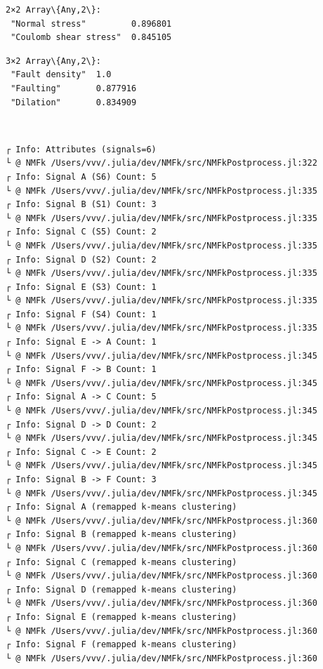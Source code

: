 \documentclass[11pt]{article}
\begin{document}
    \begin{Verbatim}[commandchars=\\\{\}]
2×2 Array\{Any,2\}:
 "Normal stress"         0.896801
 "Coulomb shear stress"  0.845105
    \end{Verbatim}



    \begin{Verbatim}[commandchars=\\\{\}]
3×2 Array\{Any,2\}:
 "Fault density"  1.0
 "Faulting"       0.877916
 "Dilation"       0.834909
    \end{Verbatim}


    \begin{center}
    \end{center}
    { \hspace*{\fill} \\}

    \begin{Verbatim}[commandchars=\\\{\}]
┌ Info: Attributes (signals=6)
└ @ NMFk /Users/vvv/.julia/dev/NMFk/src/NMFkPostprocess.jl:322
┌ Info: Signal A (S6) Count: 5
└ @ NMFk /Users/vvv/.julia/dev/NMFk/src/NMFkPostprocess.jl:335
┌ Info: Signal B (S1) Count: 3
└ @ NMFk /Users/vvv/.julia/dev/NMFk/src/NMFkPostprocess.jl:335
┌ Info: Signal C (S5) Count: 2
└ @ NMFk /Users/vvv/.julia/dev/NMFk/src/NMFkPostprocess.jl:335
┌ Info: Signal D (S2) Count: 2
└ @ NMFk /Users/vvv/.julia/dev/NMFk/src/NMFkPostprocess.jl:335
┌ Info: Signal E (S3) Count: 1
└ @ NMFk /Users/vvv/.julia/dev/NMFk/src/NMFkPostprocess.jl:335
┌ Info: Signal F (S4) Count: 1
└ @ NMFk /Users/vvv/.julia/dev/NMFk/src/NMFkPostprocess.jl:335
┌ Info: Signal E -> A Count: 1
└ @ NMFk /Users/vvv/.julia/dev/NMFk/src/NMFkPostprocess.jl:345
┌ Info: Signal F -> B Count: 1
└ @ NMFk /Users/vvv/.julia/dev/NMFk/src/NMFkPostprocess.jl:345
┌ Info: Signal A -> C Count: 5
└ @ NMFk /Users/vvv/.julia/dev/NMFk/src/NMFkPostprocess.jl:345
┌ Info: Signal D -> D Count: 2
└ @ NMFk /Users/vvv/.julia/dev/NMFk/src/NMFkPostprocess.jl:345
┌ Info: Signal C -> E Count: 2
└ @ NMFk /Users/vvv/.julia/dev/NMFk/src/NMFkPostprocess.jl:345
┌ Info: Signal B -> F Count: 3
└ @ NMFk /Users/vvv/.julia/dev/NMFk/src/NMFkPostprocess.jl:345
┌ Info: Signal A (remapped k-means clustering)
└ @ NMFk /Users/vvv/.julia/dev/NMFk/src/NMFkPostprocess.jl:360
┌ Info: Signal B (remapped k-means clustering)
└ @ NMFk /Users/vvv/.julia/dev/NMFk/src/NMFkPostprocess.jl:360
┌ Info: Signal C (remapped k-means clustering)
└ @ NMFk /Users/vvv/.julia/dev/NMFk/src/NMFkPostprocess.jl:360
┌ Info: Signal D (remapped k-means clustering)
└ @ NMFk /Users/vvv/.julia/dev/NMFk/src/NMFkPostprocess.jl:360
┌ Info: Signal E (remapped k-means clustering)
└ @ NMFk /Users/vvv/.julia/dev/NMFk/src/NMFkPostprocess.jl:360
┌ Info: Signal F (remapped k-means clustering)
└ @ NMFk /Users/vvv/.julia/dev/NMFk/src/NMFkPostprocess.jl:360
    \end{Verbatim}
\end{document}

